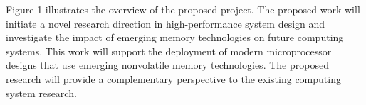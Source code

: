 Figure 1 illustrates the overview of the proposed project. The proposed work will initiate a novel research direction in high-performance system design and investigate the impact of emerging memory technologies on future computing systems. This work will support the deployment of modern microprocessor designs that use  emerging nonvolatile memory technologies. The proposed research will provide a complementary perspective to the existing computing system research.

